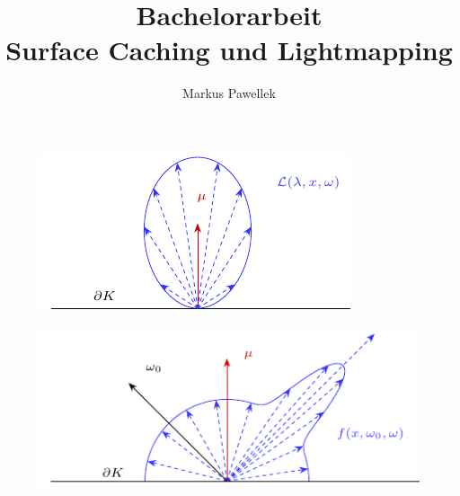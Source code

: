 

\title{Bachelorarbeit \\ Surface Caching und Lightmapping}
\author{Markus Pawellek}
\newcommand{\email}{markuspawellek@gmail.com}




	\articletitle

	\tableofcontents
	\newpage

	









	\begin{figure}[h]
		\center
		\includegraphics{gg_fig/radiance_1.pdf}
		\caption{}
	\end{figure}

	\begin{figure}[h]
		\center
		\includegraphics{gg_fig/brdf_1.pdf}
		\caption{}
	\end{figure}


